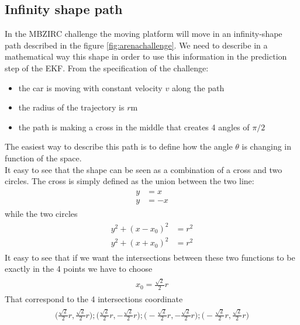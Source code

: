 \subsection{Infinity shape path}
In the MBZIRC challenge the moving platform will move in an infinity-shape path described in the figure \ref{fig:arenachallenge}. 
We need to describe in a mathematical way this shape in order to use this information in the prediction step of the EKF.
From the specification of the challenge:
\begin{itemize}
\item the car is moving with constant velocity $v$ along the path
\item the radius of the trajectory is $r$m
\item the path is making a cross in the middle that creates 4 angles of $\pi/2$ 
\end{itemize}
The easiest way to describe this path is to define how the angle $\theta$ is changing in function of the space. \\
It easy to see that the shape can be seen as a combination of a cross and two circles.
The cross is simply defined as the union between the two line:
\begin{align}
\begin{split}
y &= x \\
y &= -x
\end{split}
\end{align}
while the two circles 
\begin{align}
\begin{split}
y^2 + (x - x_0)^2 &= r^2 \\
y^2 + (x + x_0)^2 &= r^2 
\end{split}
\end{align}
It easy to see that if we want the intersections between these two functions to be exactly in the 4 points we have to choose 
\begin{align}
\begin{split}
x_0 = \frac{\sqrt{2}}{2}r
\end{split}
\end{align}
That correspond to the 4 intersections coordinate
\begin{align}
\begin{split}
\Big(\frac{\sqrt{2}}{2}r,\frac{\sqrt{2}}{2}r\Big);
\Big(\frac{\sqrt{2}}{2}r,-\frac{\sqrt{2}}{2}r\Big);
\Big(-\frac{\sqrt{2}}{2}r,-\frac{\sqrt{2}}{2}r\Big);
\Big(-\frac{\sqrt{2}}{2}r,\frac{\sqrt{2}}{2}r\Big)
\end{split}
\end{align}

